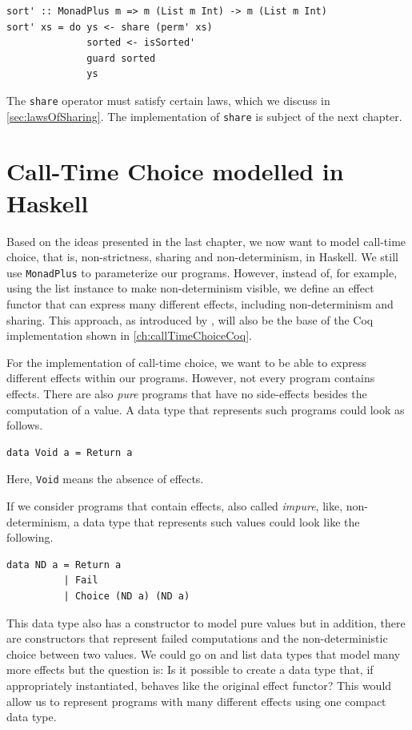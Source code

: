 \documentclass[a4paper, 11pt, fleqn, twoside]{scrreprt}
\newcommand{\todo}[1]{\marginpar{\textbf{TODO:} #1}}
\newcommand{\hinl}[1]{\texttt{#1}}
\begin{document}
\begin{verbatim}
sort' :: MonadPlus m => m (List m Int) -> m (List m Int)
sort' xs = do ys <- share (perm' xs)
              sorted <- isSorted'
              guard sorted
              ys
\end{verbatim}

The \hinl{share} operator must satisfy certain laws, which we discuss in \autoref{sec:lawsOfSharing}.
The implementation of \hinl{share} is subject of the next chapter.

\chapter{Call-Time Choice modelled in Haskell}
Based on the ideas presented in the last chapter, we now want to model call-time choice, that is, non-strictness, sharing and non-determinism, in Haskell.
We still use \hinl{MonadPlus} to parameterize our programs.
However, instead of, for example, using the list instance to make non-determinism visible, we define an effect functor that can express many different effects, including non-determinism and sharing.
This approach, as introduced by \citet{wu2014effect}, will also be the base of the Coq implementation shown in \autoref{ch:callTimeChoiceCoq}.
\todo{Definition effect}

For the implementation of call-time choice, we want to be able to express different effects within our programs.
However, not every program contains effects.
There are also \textit{pure} programs that have no side-effects besides the computation of a value.
A data type that represents such programs could look as follows.

\begin{verbatim}
data Void a = Return a
\end{verbatim}

Here, \hinl{Void} means the absence of effects.

If we consider programs that contain effects, also called \textit{impure}, like, non-determinism, a data type that represents such values could look like the following.

\begin{verbatim}
data ND a = Return a
          | Fail
          | Choice (ND a) (ND a)
\end{verbatim}

This data type also has a constructor to model pure values but in addition, there are constructors that represent failed computations and the non-deterministic choice between two values.
We could go on and list data types that model many more effects but the question is: Is it possible to create a data type that, if appropriately instantiated, behaves like the original effect functor?
This would allow us to represent programs with many different effects using one compact data type.
\end{document}

